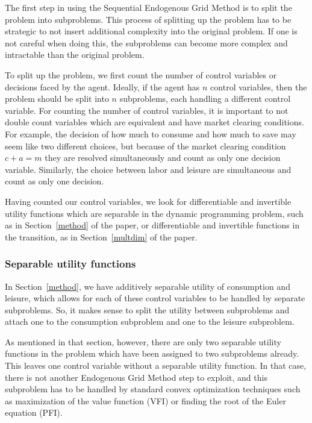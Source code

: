 \documentclass{article}
\newcommand{\cRat}{c}
\newcommand{\aRat}{a}
\newcommand{\mRat}{m}
\begin{document}
The first step in using the Sequential Endogenous Grid Method is to split the problem into subproblems. This process of splitting up the problem has to be strategic to not insert additional complexity into the original problem. If one is not careful when doing this, the subproblems can become more complex and intractable than the original problem.


To split up the problem, we first count the number of control variables or decisions faced by the agent. Ideally, if the agent has $n$ control variables, then the problem should be split into $n$ subproblems, each handling a different control variable. For counting the number of control variables, it is important to not double count variables which are equivalent and have market clearing conditions. For example, the decision of how much to consume and how much to save may seem like two different choices, but because of the market clearing condition $\cRat + \aRat = \mRat$ they are resolved simultaneously and count as only one decision variable. Similarly, the
choice between labor and leisure are simultaneous and count as only one decision.

Having counted our control variables, we look for differentiable and invertible utility functions which are separable in the dynamic programming problem, such as in Section~\ref{method} of the paper, or differentiable and invertible functions in the transition, as in Section~\ref{multdim} of the paper.


\subsubsection{Separable utility functions}\label{Separable utility functions}

In Section~\ref{method}, we have additively separable utility of consumption and leisure, which allows for each of these control variables to be handled by separate subproblems. So, it makes sense to split the utility between subproblems and attach one to the consumption subproblem and one to the leisure subproblem.

As mentioned in that section, however, there are only two separable utility functions in the problem which have been assigned to two subproblems already. This leaves one control variable without a separable utility function. In that case, there is not another Endogenous Grid Method step to exploit, and this subproblem has to be handled by standard convex optimization techniques such as maximization of the value function (VFI) or finding the root of the Euler equation (PFI).
\end{document}
